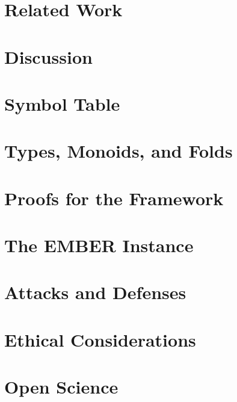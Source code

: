 \documentclass[sigconf,anonymous,acmthm=false]{acmart}
\begin{document}
\section{Related Work}
\label{sec:related-work}


\section{Discussion}
\label{sec:discussion}





\appendix

\section{Symbol Table}
\label{sec:symbols}


\section{Types, Monoids, and Folds}
\label{sec:types}


\section{Proofs for the Framework}
\label{sec:fw:proofs}


\section{The EMBER Instance}
\label{sec:ember}


\section{Attacks and Defenses}
\label{sec:attacks}


\newpage
\section{Ethical Considerations}


\section{Open Science}

\end{document}
